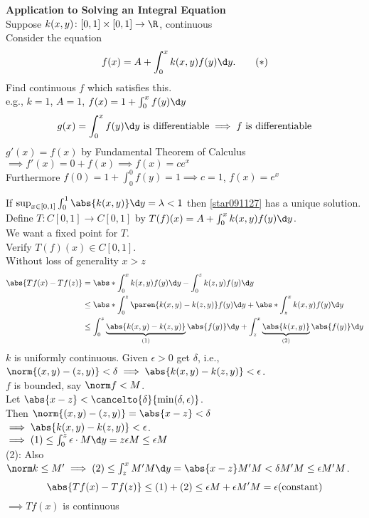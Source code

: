 \textbf{Application to Solving an Integral Equation} \\
Suppose $k(x,y)\colon[0,1]\times[0,1]\to\R$, continuous \\
Consider the equation
\[ f(x) = A + \int_0^x k(x,y)f(y)\d y . \tag{$*$}\label{star091127} \]
Find continuous $f$ which satisfies this. \\
e.g., $k=1$, $A=1$, $f(x)=1+\int_0^x f(y)\d y$
\[ g(x)=\int_0^xf(y)\d y\text{ is differentiable} \implies \text{$f$ is differentiable} \]
$g'(x)=f(x)$ by Fundamental Theorem of Calculus \\
$\implies f'(x)=0+f(x) \implies f(x)=ce^x$ \\
Furthermore $f(0)=1+\int_0^0f(y)=1\implies c=1$, $f(x)=e^x$

\thm If $\sup_{x\in[0,1]}\int_0^1\abs{k(x,y)}\d y=\lambda<1$ then \eqref{star091127} has a unique solution. \\
\pf Define $T\colon C[0,1]\to C[0,1]$ by $T(f)(x)=A+\int_0^x k(x,y)f(y)\d y$. \\
We want a fixed point for $T$. \\
Verify $T(f)(x)\in C[0,1]$. \\
Without loss of generality $x>z$
\begin{align*}
\abs{Tf(x)-Tf(z)} &= \abs*{\int_0^x k(x,y)f(y)\d y-\int_0^z k(z,y)f(y)\d y} \\
&\leq \abs*{\int_0^z\paren{k(x,y)-k(z,y)}f(y)\d y} + \abs*{\int_z^x k(x,y)f(y)\d y} \\
&\leq \int_0^z\underbrace{\abs{k(x,y)-k(z,y)}}_{(1)}\abs{f(y)}\d y + \int_z^x \underbrace{\abs{k(x,y)}}_{(2)}\abs{f(y)}\d y
\end{align*}
$k$ is uniformly continuous.  Given $\epsilon>0$ get $\delta$, i.e., $\norm{(x,y)-(z,y)}<\delta\implies\abs{k(x,y)-k(z,y)}<\epsilon$. \\
$f$ is bounded, say $\norm f<M$. \\
Let $\abs{x-z}<\cancelto{\delta}{\min(\delta,\epsilon)}$. \\
Then $\norm{(x,y)-(z,y)}=\abs{x-z}<\delta$ \\
$\implies\abs{k(x,y)-k(z,y)}<\epsilon$. \\
$\implies (1) \leq \int_0^z\epsilon\cdot M\d y = z\epsilon M\leq\epsilon M$ \\
(2): Also $\norm k\leq M'\implies (2)\leq\int_z^x M'M\d y=\abs{x-z}M'M<\delta M'M\leq\epsilon M'M$.
\[ \abs{Tf(x)-Tf(z)} \leq (1) + (2) \leq \epsilon M + \epsilon M'M = \epsilon \text{(constant)} \]
\negthickspace$\implies Tf(x)$ is continuous \\
